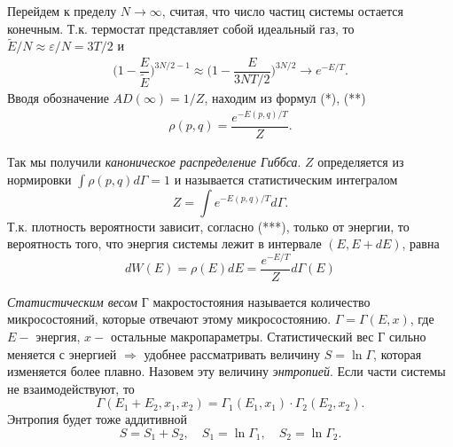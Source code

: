 \documentclass[14pt,a4paper]{scrartcl}
\begin{document}
  \quad Перейдем к пределу $N \to \infty$, считая, что число частиц системы остается конечным. Т.к. термостат представляет собой идеальный газ, то $\widetilde{E} / N \approx \varepsilon / N = 3T / 2$ и 
  \begin{align}
  \biggl(1-\dfrac{E}{\widetilde{E}}\biggr)^{3N/2-1}\approx \biggl(1-\dfrac{E}{3NT/2}\biggr)^{3N/2} \to e^{-E/T}.\tag{**}
  \end{align}
  Вводя обозначение $A D(\infty) = 1/Z$, находим из формул (*), (**)
  \begin{align}
  \rho(p,q) = \dfrac{e^{-E(p,q)/T}}{Z}.\tag{***}
  \end{align}
  
  Так мы получили \textit{каноническое распределение Гиббса}. $Z$ определяется из нормировки $\int \rho(p,q)d\Gamma = 1$ и называется статистическим интегралом 
  $$Z = \int e^{-E(p,q)/T}d\Gamma.$$
  \quad Т.к. плотность вероятности зависит, согласно (***), только от энергии, то вероятность того, что энергия системы лежит в интервале $(E, E + dE)$, равна
  $$dW(E) = \rho(E)dE = \dfrac{e^{-E/T}}{Z}d\Gamma(E)$$ 
  
  \quad \textit{Статистическим весом} Г макростостояния называется количество микросостояний, которые отвечают этому микросостоянию. $\Gamma = \Gamma(E,x)$, где $E-$ энергия, $x - $ остальные макропараметры.
  \quad Статистический вес Г сильно меняется с энергией $\Rightarrow$ удобнее рассматривать величину $S = \ln \Gamma$, которая изменяется более плавно. Назовем эту величину \textit{энтропией}.
  \quad Если части системы не взаимодействуют, то 
  $$\Gamma(E_1 +E_2,x_1,x_2) = \Gamma_1(E_1,x_1)\cdot\Gamma_2(E_2,x_2).$$
  Энтропия будет тоже аддитивной
  $$S = S_1 + S_2, \quad S_1 = \ln \Gamma_1, \quad S_2 = \ln\Gamma_2.$$
  
  
\end{document}
